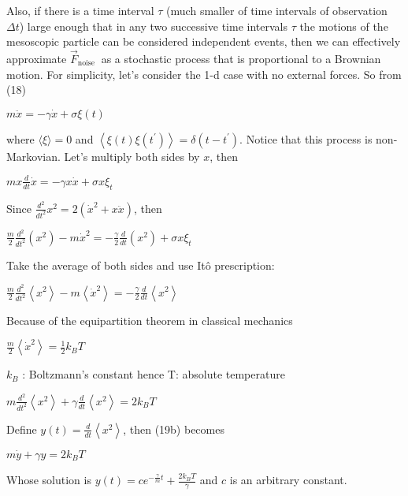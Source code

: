 Also, if there is a time interval $\tau$ (much smaller of time intervals of observation $\Delta t$) large enough that in any two successive time intervals $\tau$ the motions of the mesoscopic particle can be considered independent events, then we can effectively approximate $\vec{F}_{\text {noise }}$ as a stochastic process that is proportional to a Brownian motion.
For simplicity, let's consider the 1-d case with no external forces. So from (18)
\begin{DispWithArrows}[tag=19]
    $m \ddot{x}=-\gamma \dot{x}+\sigma \xi(t)$
\end{DispWithArrows}
where $\langle\xi\rangle=0$ and $\left\langle\xi(t) \xi\left(t^{\prime}\right)\right\rangle=\delta\left(t-t^{\prime}\right)$. Notice that this process is non-Markovian. Let's multiply both sides by $x$, then
\begin{DispWithArrows}
    $m x \frac{d}{d t} \dot{x}=-\gamma x \dot{x}+\sigma x \xi_{t}$
\end{DispWithArrows}
Since $\frac{d^{2}}{d t^{2}} x^{2}=2\left(\dot{x}^{2}+x \ddot{x}\right)$, then
\begin{DispWithArrows}
    $\frac{m}{2} \frac{d^{2}}{d t^{2}}\left(x^{2}\right)-m \dot{x}^{2}=-\frac{\gamma}{2} \frac{d}{d t}\left(x^{2}\right)+\sigma x \xi_{t}$
\end{DispWithArrows}
Take the average of both sides and use Itô prescription:
\begin{DispWithArrows}
    $\frac{m}{2} \frac{d^{2}}{d t^{2}}\left\langle x^{2}\right\rangle-m\left\langle\dot{x}^{2}\right\rangle=-\frac{\gamma}{2} \frac{d}{d t}\left\langle x^{2}\right\rangle$
\end{DispWithArrows}
Because of the equipartition theorem in classical mechanics
\begin{DispWithArrows}
    $\frac{m}{2}\left\langle\dot{x}^{2}\right\rangle=\frac{1}{2} k_{B} T$
\end{DispWithArrows}
$k_{B}$ : Boltzmann's constant
hence T: absolute temperature
\begin{DispWithArrows}[tag=19b]
    $m \frac{d^{2}}{d t^{2}}\left\langle x^{2}\right\rangle+\gamma \frac{d}{d t}\left\langle x^{2}\right\rangle=2 k_{B} T$
\end{DispWithArrows}
Define $y(t)=\frac{d}{d t}\left\langle x^{2}\right\rangle$, then (19b) becomes
\begin{DispWithArrows}
    $m \dot{y}+\gamma y=2 k_{B} T$
\end{DispWithArrows}
Whose solution is $y(t)=c e^{-\frac{\gamma}{m} t}+\frac{2 k_{B} T}{\gamma}$ and $c$ is an arbitrary constant.
